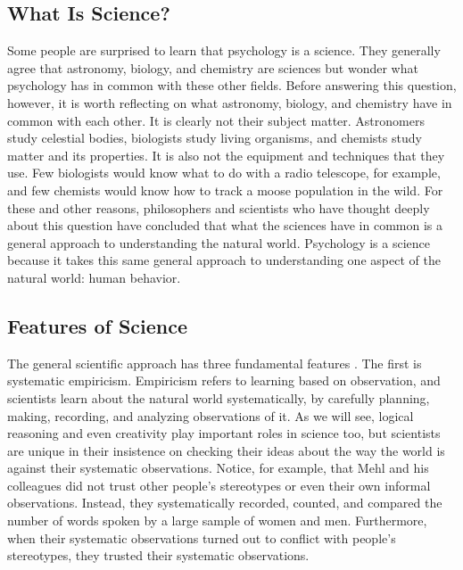 \subsection{What Is Science?}
Some people are surprised to learn that psychology is a science. They generally agree that astronomy, biology, and chemistry are sciences but wonder what psychology has in common with these other fields. Before answering this question, however, it is worth reflecting on what astronomy, biology, and chemistry have in common with each other. It is clearly not their subject matter. Astronomers study celestial bodies, biologists study living organisms, and chemists study matter and its properties. It is also not the equipment and techniques that they use. Few biologists would know what to do with a radio telescope, for example, and few chemists would know how to track a moose population in the wild. For these and other reasons, philosophers and scientists who have thought deeply about this question have concluded that what the sciences have in common is a general approach to understanding the natural world. Psychology is a science because it takes this same general approach to understanding one aspect of the natural world: human behavior.

\subsection{Features of Science}
The general scientific approach has three fundamental features \citep{stanovich_how_2013}. The  first is systematic empiricism. Empiricism refers to learning based on observation, and scientists learn about the natural world systematically, by carefully planning, making, recording, and analyzing observations of it. As we will see, logical reasoning and even creativity play important roles in science too, but scientists are unique in their insistence on checking their ideas about the way the world is against their systematic observations. Notice, for example, that Mehl and his colleagues did not trust other people's stereotypes or even their own informal observations. Instead, they systematically recorded, counted, and compared the number of words spoken by a large sample of women and men. Furthermore, when their systematic observations turned out to conflict with people's stereotypes, they trusted their systematic observations.

